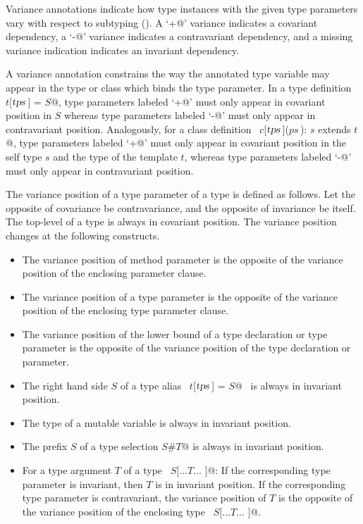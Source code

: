 \documentclass[a4paper,12pt,twoside,titlepage]{book}
\newcommand{\tps}{\mbox{\sl tps}}
\begin{document}
Variance annotations indicate how type instances with the given type
parameters vary with respect to subtyping ().  A
`\lstinline@+@' variance indicates a covariant dependency, a `\lstinline@-@'
variance indicates a contravariant dependency, and a missing variance
indication indicates an invariant dependency.

A variance annotation constrains the way the annotated type variable
may appear in the type or class which binds the type parameter.  In a
type definition ~\lstinline@type $t$[$\tps\,$] = $S$@, type parameters labeled
`\lstinline@+@' must only appear in covariant position in $S$ whereas
type parameters labeled `\lstinline@-@' must only appear in contravariant
position. Analogously, for a class definition
~\lstinline@class $c$[$\tps\,$]($ps\,$): $s$ extends $t$@, type parameters labeled
`\lstinline@+@' must only appear in covariant position in the self type
$s$ and the type of the template $t$, whereas type
parameters labeled `\lstinline@-@' must only appear in contravariant
position. 

The variance position of a type parameter of a type is defined as
follows.  Let the opposite of covariance be contravariance, and the
opposite of invariance be itself.  The top-level of a type is always
in covariant position. The variance position changes at the following
constructs.
\begin{itemize}
\item
The variance position of method parameter is the opposite of the 
variance position of the enclosing parameter clause.
\item
The variance position of a type parameter is the opposite of the
variance position of the enclosing type parameter clause.
\item
The variance position of the lower bound of a type declaration or type parameter 
is the opposite of the variance position of the type declaration or parameter.  
\item
The right hand side $S$ of a type alias ~\lstinline@type $t$[$\tps\,$] = $S$@~ 
is always in invariant position.
\item
The type of a mutable variable is always in invariant position.
\item 
The prefix $S$ of a type selection \lstinline@$S$#$T$@ is always in invariant position.
\item
For a type argument $T$ of a type ~\lstinline@$S$[$\ldots T \ldots$ ]@: If the
corresponding type parameter is invariant, then $T$ is in
invariant position.  If the corresponding type parameter is
contravariant, the variance position of $T$ is the opposite of
the variance position of the enclosing type ~\lstinline@$S$[$\ldots T \ldots$ ]@.
\end{itemize}
\end{document}
